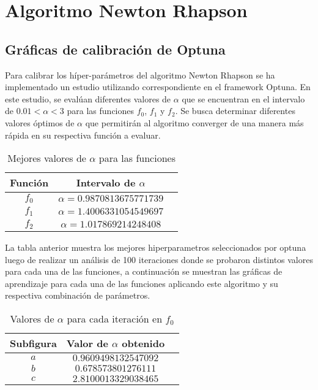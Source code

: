 \section{Algoritmo Newton Rhapson}

\subsection{Gráficas de calibración de Optuna} 

Para calibrar los híper-parámetros del algoritmo Newton Rhapson se ha implementado un estudio utilizando correspondiente en el framework Optuna. En este estudio, se evalúan diferentes valores de $\alpha$ que se encuentran en el intervalo de $0.01 < \alpha < 3$ para las funciones $f_0$, $f_1$ y $f_2$. Se busca determinar diferentes valores óptimos de $\alpha$ que permitirán al algoritmo converger de una manera más rápida en su respectiva función a evaluar. \\

\begin{table}[H]
    \centering
    \caption{Mejores valores de $\alpha$ para las funciones}
    \begin{tabular}{|c|c|c|}
    \hline
    \textbf{Función} & \textbf{Intervalo de $\alpha$} \\
    \hline
    $f_0$ & $\alpha = 0.9870813675771739$ \\
    \hline
    $f_1$ & $\alpha = 1.4006331054549697$ \\
    \hline
    $f_2$ & $\alpha = 1.017869214248408$ \\
    \hline
    \end{tabular}
    \label{tab:valores-alpha-simul_f0}
\end{table}

La tabla anterior muestra los mejores hiperparametros seleccionados por optuna luego de realizar un análisis de 100 iteraciones donde se probaron distintos valores para cada una de las funciones, a continuación se muestran las gráficas de aprendizaje para cada una de las funciones aplicando este algoritmo y su respectiva combinación de parámetros.

\begin{table}[H]
    \centering
    \caption{Valores de $\alpha$ para cada iteración en $f_0$}
    \begin{tabular}{|c|c|c|}
    \hline
    \textbf{Subfigura} & \textbf{Valor de $\alpha$ obtenido} \\
    \hline
    $a$ & $0.9609498132547092$ \\
    \hline
    $b$ & $0.678573801276111$ \\
    \hline
    $c$ & $2.8100013329038465$ \\
    \hline
    \end{tabular}
    \label{tab:values_f0_newton}
\end{table}


